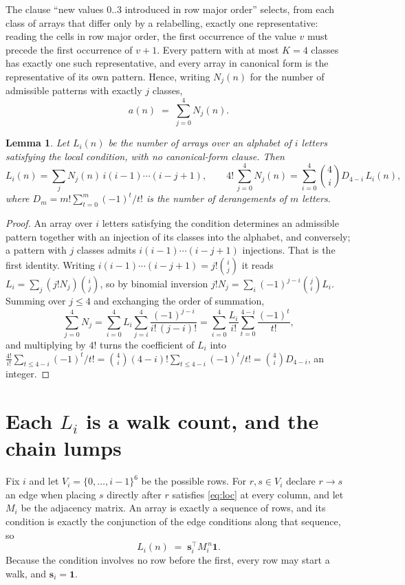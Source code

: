\documentclass[11pt,a4paper]{article}
\theoremstyle{plain}
\newtheorem{lemma}[theorem]{Lemma}
\theoremstyle{definition}
\begin{document}
The clause ``new values $0..3$ introduced in row major order'' selects, from each class
of arrays that differ only by a relabelling, exactly one representative: reading the cells in
row major order, the first occurrence of the value $v$ must precede the first occurrence of
$v+1$. Every pattern with at most $K=4$ classes has exactly one such representative, and
every array in canonical form is the representative of its own pattern. Hence, writing
$N_j(n)$ for the number of admissible patterns with exactly $j$ classes,
\begin{equation}\label{eq:apat}
a(n)\;=\;\sum_{j=0}^{4}N_j(n).
\end{equation}

\begin{lemma}\label{lem:inv}
Let $L_i(n)$ be the number of arrays over an alphabet of $i$ letters satisfying the local
condition, with no canonical-form clause. Then
\[
L_i(n)=\sum_j N_j(n)\,i(i-1)\cdots(i-j+1),
\qquad
4!\,\sum_{j=0}^{4}N_j(n)=\sum_{i=0}^{4}\binom{4}{i}D_{4-i}\,L_i(n),
\]
where $D_m=m!\sum_{t=0}^{m}(-1)^t/t!$ is the number of derangements of $m$ letters.
\end{lemma}

\begin{proof}
An array over $i$ letters satisfying the condition determines an admissible pattern together
with an injection of its classes into the alphabet, and conversely; a pattern with $j$
classes admits $i(i-1)\cdots(i-j+1)$ injections. That is the first identity. Writing
$i(i-1)\cdots(i-j+1)=j!\binom{i}{j}$ it reads $L_i=\sum_j (j!N_j)\binom{i}{j}$, so by
binomial inversion $j!N_j=\sum_{i}(-1)^{j-i}\binom{j}{i}L_i$. Summing over
$j\le 4$ and exchanging the order of summation,
\[
\sum_{j=0}^{4}N_j=\sum_{i=0}^{4}L_i\sum_{j=i}^{4}\frac{(-1)^{j-i}}{i!\,(j-i)!}
=\sum_{i=0}^{4}\frac{L_i}{i!}\sum_{t=0}^{4-i}\frac{(-1)^t}{t!} ,
\]
and multiplying by $4!$ turns the coefficient of $L_i$ into
$\frac{4!}{i!}\sum_{t\le 4-i}(-1)^t/t!=\binom{4}{i}(4-i)!\sum_{t\le 4-i}(-1)^t/t!
=\binom{4}{i}D_{4-i}$, an integer.
\end{proof}

\section{Each $L_i$ is a walk count, and the chain lumps}

Fix $i$ and let $V_i=\{0,\dots,i-1\}^{6}$ be the possible rows. For $r,s\in V_i$
declare $r\to s$ an edge when placing $s$ directly after $r$ satisfies \eqref{eq:loc} at
every column, and let $M_i$ be the adjacency matrix. An array is exactly a sequence of
rows, and its condition is exactly the conjunction of the edge conditions along that
sequence, so
\[
L_i(n)\;=\;\mathbf{s}_i^{\!\top}M_i^{\,n}\mathbf{1} .
\]
Because the condition involves no row before the first, every
row may start a walk, and $\mathbf{s}_i=\mathbf{1}$.
\end{document}
